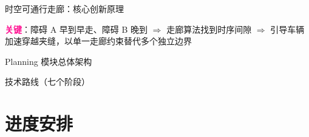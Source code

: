 \documentclass{beamer}
\begin{document}
\begin{frame}{时空可通行走廊：核心创新原理}
  \centering
  \vspace{-0.5em}
  
  \vspace{0.1em}
  {\footnotesize
   \textcolor{deeppink}{\textbf{关键}}：障碍 A 早到早走、障碍 B 晚到
   $\Rightarrow$ 走廊算法找到时序间隙
   $\Rightarrow$ 引导车辆加速穿越夹缝，以单一走廊约束替代多个独立边界}
\end{frame}

\begin{frame}{Planning 模块总体架构}
  \centering
  \vspace{-0.3em}
  
\end{frame}

\begin{frame}{技术路线（七个阶段）}
  \centering
  \vspace{-0.4em}
  
\end{frame}

\section{进度安排}
\end{document}
